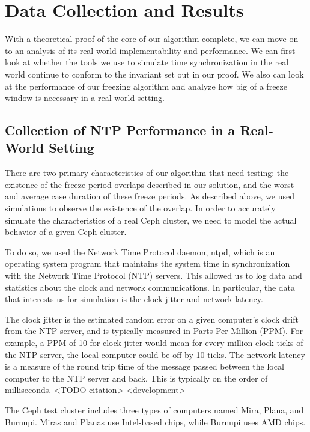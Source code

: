 \chapter{Data Collection and Results}
\label{sec:results}


With a theoretical proof of the core of our algorithm complete, we can
move on to an analysis of its real-world implementability and
performance. We can first look at whether the tools we use to simulate
time synchronization in the real world continue to conform to the
invariant set out in our proof. We also can look at the performance of
our freezing algorithm and analyze how big of a freeze window is
necessary in a real world setting.

\section{Collection of NTP Performance in a Real-World Setting}

There are two primary characteristics of our algorithm that need
testing: the existence of the freeze period overlaps described in our
solution, and the worst and average case duration of these freeze
periods. As described above, we used simulations to observe the
existence of the overlap. In order to accurately simulate the
characteristics of a real Ceph cluster, we need to model the actual
behavior of a given Ceph cluster.

To do so, we used the Network Time Protocol daemon, ntpd, which is an
operating system program that maintains the system time in
synchronization with the Network Time Protocol (NTP) servers. This
allowed us to log data and statistics about the clock and network
communications. In particular, the data that interests us for
simulation is the clock jitter and network latency.

The clock jitter is the estimated random error on a given computer’s
clock drift from the NTP server, and is typically measured in Parts
Per Million (PPM). For example, a PPM of 10 for clock jitter would
mean for every million clock ticks of the NTP server, the local
computer could be off by 10 ticks. The network latency is a measure of
the round trip time of the message passed between the local computer
to the NTP server and back. This is typically on the order of
milliseconds. <TODO citation> <development>

The Ceph test cluster includes three types of computers named Mira,
Plana, and Burnupi. Miras and Planas use Intel-based chips, while
Burnupi uses AMD chips.

